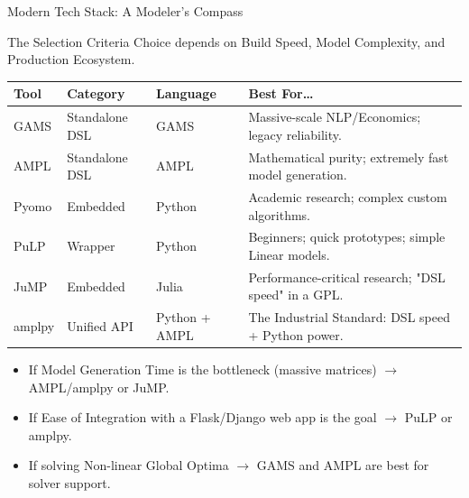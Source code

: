 \documentclass[presentation, aspectratio=169]{beamer}
\begin{document}
\begin{frame}[label={sec:org8cb18bb}]{Modern Tech Stack: A Modeler's Compass}
\begin{block}{The Selection Criteria}
Choice depends on \alert{\alert{Build Speed}}, \alert{\alert{Model Complexity}}, and \alert{\alert{Production Ecosystem}}.

\scriptsize
\begin{center}
\begin{tabular}{llll}
\hline
Tool & Category & Language & Best For\ldots{}\\
\hline
\alert{\alert{GAMS}} & Standalone DSL & GAMS & Massive-scale NLP/Economics; legacy reliability.\\
\alert{\alert{AMPL}} & Standalone DSL & AMPL & Mathematical purity; extremely fast model generation.\\
\alert{\alert{Pyomo}} & Embedded & Python & Academic research; complex custom algorithms.\\
\alert{\alert{PuLP}} & Wrapper & Python & Beginners; quick prototypes; simple Linear models.\\
\alert{\alert{JuMP}} & Embedded & Julia & Performance-critical research; "DSL speed" in a GPL.\\
\alert{\alert{amplpy}} & \alert{\alert{Unified API}} & \alert{\alert{Python + AMPL}} & \alert{\alert{The Industrial Standard}}: DSL speed + Python power.\\
\hline
\end{tabular}
\end{center}
\end{block}

\begin{block}{}
\begin{itemize}
\item If \alert{\alert{Model Generation Time}} is the bottleneck (massive matrices) \(\to\) \alert{\alert{AMPL/amplpy}} or \alert{\alert{JuMP}}.
\item If \alert{\alert{Ease of Integration}} with a Flask/Django web app is the goal \(\to\) \alert{\alert{PuLP}} or \alert{\alert{amplpy}}.
\item If solving \alert{\alert{Non-linear Global Optima}} \(\to\) \alert{\alert{GAMS}} and \alert{\alert{AMPL}} are best for solver support.
\end{itemize}
\end{block}
\end{frame}
\end{document}
